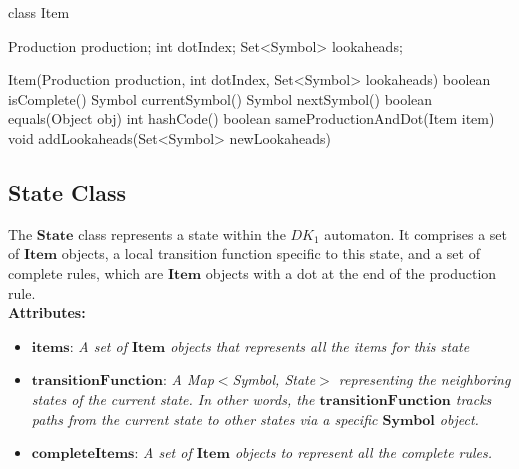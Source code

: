 \begin{codeblock}
    class Item {
        Production production;
        int dotIndex;
        Set<Symbol> lookaheads;

        Item(Production production, int dotIndex, Set<Symbol> lookaheads) {}
        boolean isComplete() {}
        Symbol currentSymbol() {}
        Symbol nextSymbol(){}
        boolean equals(Object obj) {}
        int hashCode() {}
        boolean sameProductionAndDot(Item item) {}
        void addLookaheads(Set<Symbol> newLookaheads) {}
    }
\end{codeblock}

\vspace{10pt}

\subsection{State Class}

The \(\boldsymbol{State}\) class represents a state within the \(DK_{1}\) automaton. It comprises a set of \(\boldsymbol{Item}\) objects, a local transition function specific to this state, and a set of complete rules, which are \(\boldsymbol{Item}\) objects with a dot at the end of the production rule.\\

\textbf{Attributes:}
\begin{itemize}
    \item \(\boldsymbol{items}\): \textit{A set of \(\boldsymbol{Item}\) objects that represents all the items for this state}
    \item \(\boldsymbol{transitionFunction}\): \textit{A Map\(<\)Symbol, State\(>\) representing the neighboring states of the current state. In other words, the \(\boldsymbol{transitionFunction}\) tracks paths from the current state to other states via a specific \(\boldsymbol{Symbol}\) object.}
    \item \(\boldsymbol{completeItems}\): \textit{A set of \(\boldsymbol{Item}\) objects to represent all the complete rules.}
\end{itemize}

